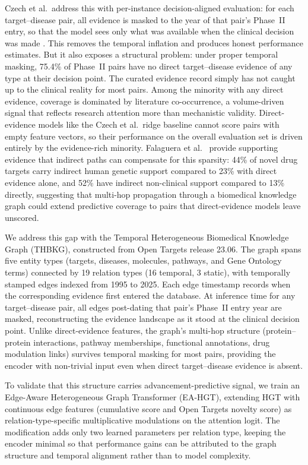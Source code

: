 \documentclass[a4,center]{NAR}
\newcommand{\eahgt}{\textsc{EA-HGT}}
\begin{document}
{Czech et al.\ address this with per-instance decision-aligned evaluation:
for each target--disease pair, all evidence is masked to the year of that
pair's Phase~II entry, so that the model sees only what was available when
the clinical decision was made \citep{Czech2024CLINICALFORECASTING}. This removes the
temporal inflation and produces honest performance estimates. But it also
exposes a structural problem: under proper temporal masking, 75.4\% of
Phase~II pairs have no direct target--disease evidence of any type at
their decision point. The curated evidence record simply has not caught up
to the clinical reality for most pairs. Among the minority with any direct
evidence, coverage is dominated by literature co-occurrence, a
volume-driven signal that reflects research attention more than
mechanistic validity. Direct-evidence models like the Czech et al.\ ridge
baseline cannot score pairs with empty feature vectors, so their
performance on the overall evaluation set is driven entirely by the
evidence-rich minority. Falaguera et al.\ \citep{Falaguera2025TemporalDiscovery} provide
supporting evidence that indirect paths can compensate for this sparsity:
44\% of novel drug targets carry indirect human genetic support compared
to 23\% with direct evidence alone, and 52\% have indirect non-clinical
support compared to 13\% directly, suggesting that multi-hop propagation
through a biomedical knowledge graph could extend predictive coverage to
pairs that direct-evidence models leave unscored.

We address this gap with the Temporal Heterogeneous Biomedical Knowledge
Graph (THBKG), constructed from Open Targets release 23.06. The graph
spans five entity types (targets, diseases, molecules, pathways, and Gene
Ontology terms) connected by 19 relation types (16 temporal, 3 static),
with temporally stamped edges indexed from 1995 to 2025. Each edge
timestamp records when the corresponding evidence first entered the
database. At inference time for any target--disease pair, all edges
post-dating that pair's Phase~II entry year are masked, reconstructing the
evidence landscape as it stood at the clinical decision point. Unlike
direct-evidence features, the graph's multi-hop structure (protein--protein
interactions, pathway memberships, functional annotations, drug modulation
links) survives temporal masking for most pairs, providing the encoder with
non-trivial input even when direct target--disease evidence is absent.

To validate that this structure carries advancement-predictive signal, we
train an Edge-Aware Heterogeneous Graph Transformer (\eahgt{}), extending
HGT \citep{Hu2020HeterogeneousTransformer} with continuous edge features (cumulative score and
Open Targets novelty score) as relation-type-specific multiplicative
modulations on the attention logit. The modification adds only two learned
parameters per relation type, keeping the encoder minimal so that
performance gains can be attributed to the graph structure and temporal
alignment rather than to model complexity.

}
\end{document}
